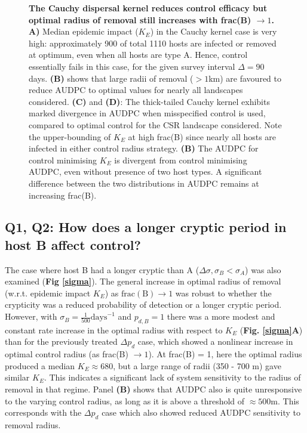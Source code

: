 \documentclass[11pt,letterpaper]{article}
\begin{document}
 \begin{figure}
 	\centering
 	
 		\caption{\label{cauchycomplex} \textbf{The Cauchy dispersal kernel reduces control efficacy but optimal radius of removal still increases with frac(B) $\rightarrow 1$.} \textbf{A)} Median epidemic impact ($K_{E}$) in the Cauchy kernel case is very high: approximately 900 of total 1110 hosts are infected or removed at optimum, even when all hosts are type A. Hence, control essentially fails in this case, for the given survey interval $\Delta = 90$ days. \textbf{(B)} shows that large radii of removal ($>1 $km) are favoured to reduce AUDPC to optimal values for nearly all landscapes considered. \textbf{(C)} and \textbf{(D)}: The thick-tailed Cauchy kernel exhibits marked divergence in AUDPC when misspecified control is used, compared to optimal control for the CSR landscape considered.  Note the upper-bounding of $K_E$ at high frac(B) since nearly all hosts are infected in either control radius strategy. \textbf{(B)} The AUDPC for control minimising $K_E$ is divergent from control minimising AUDPC, even without presence of two host types. A significant difference between the two distributions in AUDPC remains at increasing frac(B).}
 \end{figure}
 
  
 \FloatBarrier
 \subsection*{Q1, Q2: How does a longer cryptic period in host B affect control?}

  
The case where host B had a longer cryptic than A ($\Delta \sigma, \sigma_{B} < \sigma_{A}$) was also examined (\textbf{Fig \ref{sigma}}). The general increase in optimal radius of removal (w.r.t. epidemic impact $K_E$) as $\mathrm{frac(B)} \rightarrow 1$ was robust to whether the crypticity was a reduced probability of detection or a longer cryptic period.
However, with $\sigma_{B} = \frac{1}{500} \mathrm{days}^{-1}$ and $ p_{d,B} = 1$ there was a more modest and constant rate increase in the optimal radius with respect to $K_E$ (\textbf{Fig. \ref{sigma}A}) than for the previously treated $\Delta p_{d}$ case, which showed a nonlinear increase in optimal control radius (as frac(B) $\rightarrow 1$). At frac(B) = 1, here the optimal radius produced a median $K_E \approx 680$, but a large range of radii (350 - 700 m) gave similar $K_E$. This indicates a significant lack of system sensitivity to the radius of removal in that regime. Panel \textbf{(B)} shows that AUDPC also is quite unresponsive to the varying control radius, as long as it is above a threshold of $\approx 500$m. This corresponds with the $\Delta p_{d}$ case which also showed reduced AUDPC sensitivity to removal radius.
\end{document}
